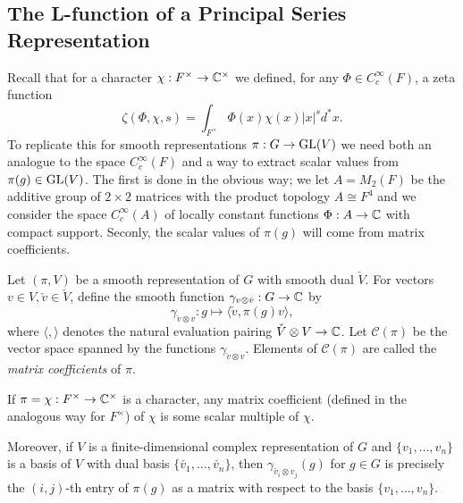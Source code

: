 \subsection{The L-function of a Principal Series Representation}

Recall that for a character $\chi:F^\times \to \mathbb{C}^\times$ we defined, for any $\Phi \in C_c^\infty(F)$, a zeta function $$\zeta(\Phi,\chi,s) = \int_{F^\times} \Phi(x)\chi(x) |x|^s d^*x.$$
To replicate this for smooth representations $\pi : G \to \mathrm{GL}(V)$ we need both an analogue to the space $C_c^\infty(F)$ and a way to extract scalar values from $\pi(g) \in \mathrm{GL}(V)$. The first is done in the obvious way; we let $A=M_2(F)$ be the additive group of $2\times2$ matrices with the product topology $A\cong F^4$ and we consider the space $C_c^\infty(A)$ of locally constant functions $\Phi:A\to\mathbb{C}$ with compact support. Seconly, the scalar values of $\pi(g)$ will come from matrix coefficients.

\begin{defn}
Let $(\pi,V)$ be a smooth representation of $G$ with smooth dual $\check{V}$. For vectors $v\in V, \check{v} \in \check{V}$, define the smooth function $\gamma_{v \otimes \check{v}}: G \to \mathbb{C}$ by 
$$\gamma_{\check{v} \otimes v} : g \mapsto \langle \check{v},\pi(g) v \rangle,$$ where $\langle, \rangle$ denotes the natural evaluation pairing $\check{V} \otimes V \to \mathbb{C}$. Let $\mathcal C(\pi)$ be the vector space spanned by the functions $\gamma_{\check{v} \otimes v}$. Elements of $\mathcal C(\pi)$ are called the \textit{matrix coefficients} of $\pi$.
\end{defn}
\begin{rem}
    If $\pi=\chi:F^\times \to \mathbb{C}^\times$ is a character, any matrix coefficient (defined in the analogous way for $F^\times$) of $\chi$ is some scalar multiple of $\chi$.

    Moreover, if $V$ is a finite-dimensional complex representation of $G$ and $\{v_1,\ldots,v_n\}$ is a basis of $V$ with dual basis $\{\check{v_1},\ldots,\check{v_n}\}$, then $\gamma_{\check{v_i}\otimes v_j}(g)$ for $g\in G$ is precisely the $(i,j)$-th entry of $\pi(g)$ as a matrix with respect to the basis $\{v_1,\ldots,v_n\}$.
\end{rem}

\iffalse
\begin{defn}
    Let $(\pi,V)$ be an irreducible smooth representation of $G$. The centre $Z$ of $G$ acts on $V$ via the central character $\omega_\pi : Z \to \CC^\times$.
\end{defn}
\fi

